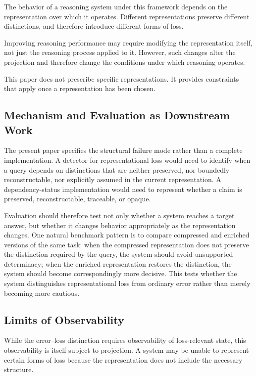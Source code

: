 \documentclass[11pt]{article}
\begin{document}
The behavior of a reasoning system under this framework depends on the representation over which it operates. Different representations preserve different distinctions, and therefore introduce different forms of loss.

Improving reasoning performance may require modifying the representation itself, not just the reasoning process applied to it. However, such changes alter the projection and therefore change the conditions under which reasoning operates.

This paper does not prescribe specific representations. It provides constraints that apply once a representation has been chosen.

\subsection{Mechanism and Evaluation as Downstream Work}

The present paper specifies the structural failure mode rather than a complete implementation. A detector for representational loss would need to identify when a query depends on distinctions that are neither preserved, nor boundedly reconstructable, nor explicitly assumed in the current representation. A dependency-status implementation would need to represent whether a claim is preserved, reconstructable, traceable, or opaque.

Evaluation should therefore test not only whether a system reaches a target answer, but whether it changes behavior appropriately as the representation changes. One natural benchmark pattern is to compare compressed and enriched versions of the same task: when the compressed representation does not preserve the distinction required by the query, the system should avoid unsupported determinacy; when the enriched representation restores the distinction, the system should become correspondingly more decisive. This tests whether the system distinguishes representational loss from ordinary error rather than merely becoming more cautious.

\subsection{Limits of Observability}

While the error--loss distinction requires observability of loss-relevant state, this observability is itself subject to projection. A system may be unable to represent certain forms of loss because the representation does not include the necessary structure.
\end{document}
